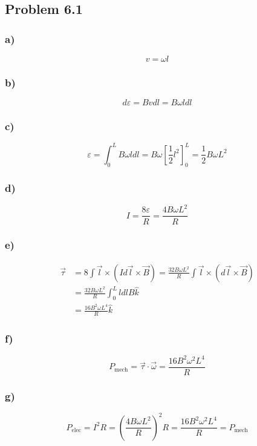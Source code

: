 \documentclass[../homework.tex]{subfiles}
\begin{document}
\subsection{Problem 6.1}
\subsubsection*{a)}
\begin{equation*}
    v = \omega l 
\end{equation*}

\subsubsection*{b)}
\begin{equation*}
    d \varepsilon = B v dl = B \omega l dl
\end{equation*}

\subsubsection*{c)}
\begin{equation*}
    \varepsilon = \int_{0}^{L} B \omega l dl = B \omega \left[ \frac{1}{2} l^2 \right]^{L}_{0} = \frac{1}{2} B \omega L^2
\end{equation*}

\subsubsection*{d)}
\begin{equation*}
    I = \frac{8 \varepsilon}{R} = \frac{4 B \omega L^2}{R}
\end{equation*}

\subsubsection*{e)}
\begin{align*}
    \vec{\tau} &= 8 \int \vec{l} \times (I d\vec{l} \times \vec{B}) = \frac{32 B \omega L^2}{R} \int \vec{l} \times (d\vec{l} \times \vec{B})\\
    &= \frac{32 B \omega L^2}{R} \int_0^{L} l dl B \hat{k} \\
    &= \frac{16 B^2 \omega L^4}{R} \hat{k}
\end{align*}

\subsubsection*{f)}
\begin{equation*}
    P_{\text{mech}} = \vec{\tau} \cdot \vec{\omega} = \frac{16 B^2 \omega^2 L^4}{R}
\end{equation*}

\subsubsection*{g)}
\begin{equation*}
    P_{\text{elec}} = I^2 R = \left(\frac{4 B \omega L^2}{R}\right)^2 R = \frac{16 B^2 \omega^2 L^4}{R} = P_{\text{mech}}
\end{equation*}
\end{document}
